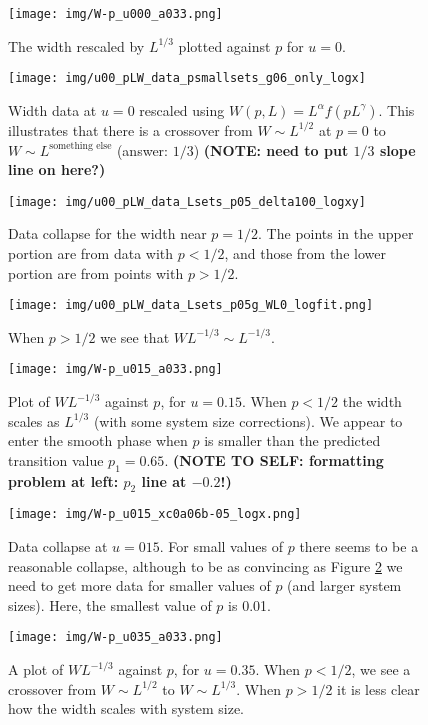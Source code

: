 \documentclass[a4paper,10pt]{article}
\newcommand{\fref}[1]{Figure \ref{#1}}
\begin{document}
\begin{figure}
 \centering
 \texttt{[image: img/W-p\_u000\_a033.png]}
 \caption{The width rescaled by $L^{1/3}$ plotted against $p$ for $u=0$.}
 \label{fig:W-p_u00_a033}
\end{figure}
\begin{figure}
 \centering
 \texttt{[image: img/u00\_pLW\_data\_psmallsets\_g06\_only\_logx]}
 \caption{Width data at $u=0$ rescaled using $W(p,L) = L^{\alpha}f(pL^\gamma)$. This illustrates that there is a crossover from $W \sim L^{1/2}$ at $p=0$ to $W \sim L^{\mbox{something else}}$ (answer: $1/3$) {\bf (NOTE: need to put $1/3$ slope line on here?)}}
 \label{fig:W-p_u00_collapse}
\end{figure} 
\begin{figure}
 \centering
 \texttt{[image: img/u00\_pLW\_data\_Lsets\_p05\_delta100\_logxy]}
 \caption{Data collapse for the width near $p = 1/2$. The points in the upper portion are from data with $p<1/2$, and those from the lower portion are from points with $p > 1/2$.}
 \label{fig:u00_p05_scaling}
\end{figure}
\begin{figure}[h!]
  \centering
  \texttt{[image: img/u00\_pLW\_data\_Lsets\_p05g\_WL0\_logfit.png]} 
  \caption{When $p > 1/2$ we see that $W L^{-1/3} \sim L^{-1/3}$.}
  \label{fig:u00_pg05_logfit}
\end{figure}
\begin{figure}
 \centering
 \texttt{[image: img/W-p\_u015\_a033.png]}
 \caption{Plot of $WL^{-1/3}$ against $p$, for $u = 0.15$. When $p < 1/2$ the width scales as $L^{1/3}$ (with some system size corrections). We appear to enter the smooth phase when $p$ is smaller than the predicted transition value $p_1 = 0.65$. {\bf (NOTE TO SELF: formatting problem at left: $p_2$ line at $-0.2$!)}}
 \label{fig:u015_W}
\end{figure}
\begin{figure}
 \centering
 \texttt{[image: img/W-p\_u015\_xc0a06b-05\_logx.png]}
 \caption{Data collapse at $u=015$. For small values of $p$ there seems to be a reasonable collapse, although to be as convincing as \fref{fig:W-p_u00_collapse} we need to get more data for smaller values of $p$ (and larger system sizes). Here, the smallest value of $p$ is 0.01.}
 \label{fig:u015_W_p0_rs}
\end{figure}
\begin{figure}
 \centering
 \texttt{[image: img/W-p\_u035\_a033.png]}
 \caption{A plot of $WL^{-1/3}$ against $p$, for $u = 0.35$. When $p  <1/2$, we see a crossover from $W\sim L^{1/2}$ to $W \sim L^{1/3}$. When $p > 1/2$ it is less clear how the width scales with system size.}
 \label{fig:W-p_u035_a033}
\end{figure}
\end{document}
